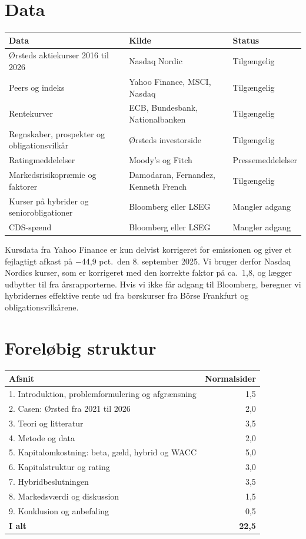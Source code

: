 \documentclass[11pt,a4paper]{article}
\begin{document}
\section{Data}

\begin{center}
\small
\begin{tabularx}{\textwidth}{@{}XXl@{}}
\toprule
\textbf{Data} & \textbf{Kilde} & \textbf{Status} \\
\midrule
Ørsteds aktiekurser 2016 til 2026 & Nasdaq Nordic & Tilgængelig \\
Peers og indeks & Yahoo Finance, MSCI, Nasdaq & Tilgængelig \\
Rentekurver & ECB, Bundesbank, Nationalbanken & Tilgængelig \\
Regnskaber, prospekter og obligationsvilkår & Ørsteds investorside & Tilgængelig \\
Ratingmeddelelser & Moody's og Fitch & Pressemeddelelser \\
Markedsrisikopræmie og faktorer & Damodaran, Fernandez, Kenneth French & Tilgængelig \\
Kurser på hybrider og seniorobligationer & Bloomberg eller LSEG & Mangler adgang \\
CDS-spænd & Bloomberg eller LSEG & Mangler adgang \\
\bottomrule
\end{tabularx}
\end{center}

Kursdata fra Yahoo Finance er kun delvist korrigeret for emissionen og giver et fejlagtigt afkast på $-$44,9 pct.\ den 8. september 2025. Vi bruger derfor Nasdaq Nordics kurser, som er korrigeret med den korrekte faktor på ca.\ 1,8, og lægger udbytter til fra årsrapporterne. Hvis vi ikke får adgang til Bloomberg, beregner vi hybridernes effektive rente ud fra børskurser fra Börse Frankfurt og obligationsvilkårene.

\section{Foreløbig struktur}

\begin{center}
\small
\begin{tabular}{@{}lr@{}}
\toprule
\textbf{Afsnit} & \textbf{Normalsider} \\
\midrule
1. Introduktion, problemformulering og afgrænsning & 1,5 \\
2. Casen: Ørsted fra 2021 til 2026 & 2,0 \\
3. Teori og litteratur & 3,5 \\
4. Metode og data & 2,0 \\
5. Kapitalomkostning: beta, gæld, hybrid og WACC & 5,0 \\
6. Kapitalstruktur og rating & 3,0 \\
7. Hybridbeslutningen & 3,5 \\
8. Markedsværdi og diskussion & 1,5 \\
9. Konklusion og anbefaling & 0,5 \\
\midrule
\textbf{I alt} & \textbf{22,5} \\
\bottomrule
\end{tabular}
\end{center}
\end{document}

